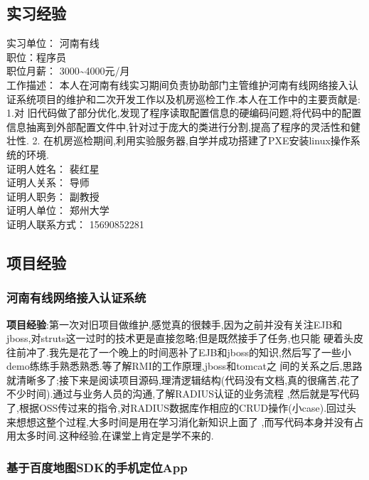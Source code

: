 \documentclass[11pt]{ctexart}
\begin{document}
\subsection{实习经验}
\label{sec-1-5}
实习单位： 河南有线\\
职位：程序员\\
职位月薪： 3000\textasciitilde{}4000元/月\\
工作描述： 本人在河南有线实习期间负责协助部门主管维护河南有线网络接入认证系统项目的维护和二次开发工作以及机房巡检工作.本人在工作中的主要贡献是: 1.对
旧代码做了部分优化,发现了程序读取配置信息的硬编码问题,将代码中的配置信息抽离到外部配置文件中,针对过于庞大的类进行分割,提高了程序的灵活性和健壮性. 2.
在机房巡检期间,利用实验服务器,自学并成功搭建了PXE安装linux操作系统的环境.\\
证明人姓名： 裴红星\\
证明人关系： 导师\\
证明人职务： 副教授\\
证明人单位： 郑州大学\\
证明人联系方式： 15690852281\\
\subsection{项目经验}
\label{sec-1-6}
\subsubsection{河南有线网络接入认证系统}
\label{sec-1-6-1}


\textbf{项目经验}:第一次对旧项目做维护,感觉真的很棘手,因为之前并没有关注EJB和jboss,对struts这一过时的技术更是直接忽略;但是既然接手了任务,也只能
硬着头皮往前冲了.我先是花了一个晚上的时间恶补了EJB和jboss的知识,然后写了一些小demo练练手熟悉熟悉.等了解RMI的工作原理,jboss和tomcat之
间的关系之后,思路就清晰多了;接下来是阅读项目源码,理清逻辑结构(代码没有文档,真的很痛苦,花了不少时间).通过与业务人员的沟通,了解RADIUS认证的业务流程
,然后就是写代码了,根据OSS传过来的指令,对RADIUS数据库作相应的CRUD操作(小case).回过头来想想这整个过程,大多时间是用在学习消化新知识上面了
,而写代码本身并没有占用太多时间.这种经验,在课堂上肯定是学不来的.
\subsubsection{基于百度地图SDK的手机定位App}
\label{sec-1-6-2}
\end{document}
